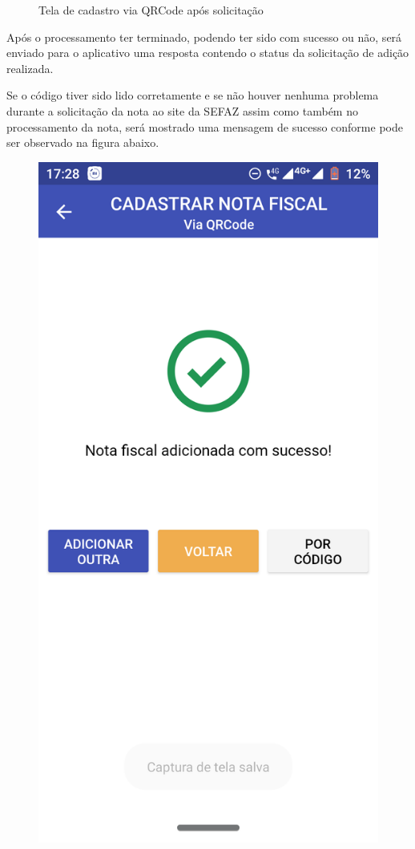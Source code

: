 \begin{figure}[h]
    \caption{Tela de cadastro via QRCode após solicitação}
    \label{appQRCodeSolicitacaoFig}
\end{figure}

Após o processamento ter terminado, podendo ter sido com sucesso ou não, será enviado para o aplicativo uma resposta contendo o status da solicitação de adição realizada.

Se o código tiver sido lido corretamente e se não houver nenhuma problema durante a solicitação da nota ao site da SEFAZ assim como também no processamento da nota, será mostrado uma mensagem de sucesso conforme pode ser observado na figura abaixo.

\begin{figure}[h]
    \centering
    \includegraphics[scale=0.15]{tcc/figures/app/app_codigo_qrcode_sucesso.png}

\end{figure}
